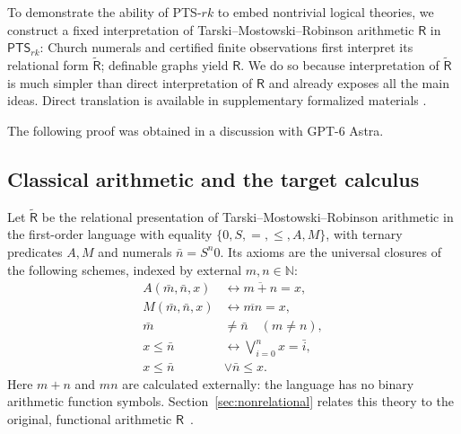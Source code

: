 \documentclass{article}
\theoremstyle{definition}
\theoremstyle{remark}
\newcommand{\PTS}{\mathsf{PTS}_{rk}}
\newcommand{\Rt}{\widetilde{\mathsf R}}
\newcommand{\R}{\mathsf R}
\begin{document}
To demonstrate the ability of PTS-$rk$ to embed
nontrivial logical theories, we construct a fixed
interpretation of Tarski--Mostowski--Robinson
arithmetic $\R$ in $\PTS$: Church numerals and
certified finite observations first interpret its
relational form $\Rt$; definable graphs yield $\R$. We
do so because interpretation of $\Rt$ is much simpler
than direct interpretation of $\R$ and already exposes
all the main ideas. Direct translation is available in
supplementary formalized materials
.

The following proof was obtained in a discussion with
GPT-6 Astra.

\subsection
{Classical arithmetic and the target calculus}

Let $\Rt$ be the relational presentation of
Tarski--Mostowski--Robinson arithmetic in the
first-order language with equality $\{0,S,=,\le,A,M\}$,
with ternary predicates $A,M$ and numerals
$\bar n=S^n0$. Its axioms are the universal closures of
the following schemes, indexed by external
$m,n\in\mathbb N$:
\begin{align}
    A(\bar m,\bar n,x)&\leftrightarrow
    \overline{m+n}=x,
    \tag{$\widetilde R1$}\label{rtilde:add}\\
    M(\bar m,\bar n,x)&\leftrightarrow \overline{mn}=x,
    \tag{$\widetilde R2$}\\
    \bar m&\ne\bar n\quad(m\ne n),
    \tag{$\widetilde R3$}\\
    x\le\bar n&\leftrightarrow\bigvee_{i=0}^{n}x=
    \bar i,
    \tag{$\widetilde R4$}\label{rtilde:bound}\\
    x\le\bar n&\lor\bar n\le x.
    \tag{$\widetilde R5$}\label{rtilde:compare}
\end{align}
Here $m+n$ and $mn$ are calculated externally: the
language has no binary arithmetic function symbols.
Section~\ref{sec:nonrelational} relates this theory
to the original, functional arithmetic
$\R$~\cite{tarski1953undecidable}.
\end{document}
